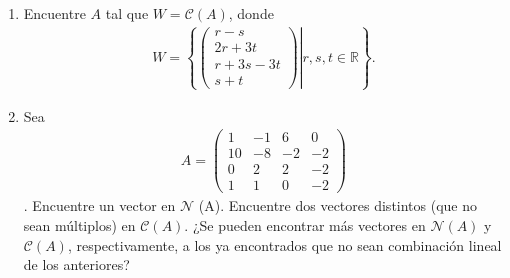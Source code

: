 \documentclass[11pt,letterpaper]{article}
\newcommand{\mR}{\mathbb{R}}
\begin{document}
\begin{enumerate}
\item Encuentre $A$ tal que $W=\mathcal{C}(A)$, donde
\begin{align*}
W=\left\{\left.\begin{pmatrix}
r-s\\
2r+3t\\
r+3s-3t\\
s+t
\end{pmatrix}\right| r,s,t\in \mR \right\}.
\end{align*}

\item Sea \begin{align*}
A=\begin{pmatrix}
 1 & -1 & 6 & 0\\
10 & -8 &-2 &-2\\
 0 &  2 & 2 &-2\\
 1 &  1 & 0 &-2
\end{pmatrix}
\end{align*}.
Encuentre un vector en $\mathcal{N}$ (A). Encuentre dos vectores distintos (que no sean múltiplos) en $\mathcal{C}(A)$. ¿Se pueden encontrar más vectores en $\mathcal{N}(A)$ y $\mathcal{C}(A)$, respectivamente, a los ya encontrados que no sean combinación lineal de los anteriores?





\end{enumerate}
\end{document}
